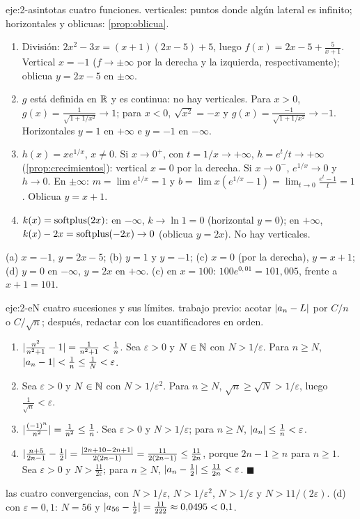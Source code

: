 \begin{solucion}{eje:2-asintotas}
\datos cuatro funciones.
\planteamiento verticales: puntos donde algún lateral es infinito; horizontales y oblicuas: \cref{prop:oblicua}.
\pasos
\begin{enumerate}[label=(\alph*)]
  \item División: $2x^{2}-3x=(x+1)(2x-5)+5$, luego $f(x)=2x-5+\frac{5}{x+1}$. Vertical $x=-1$ ($f\to\pm\infty$ por la derecha y la izquierda, respectivamente); oblicua $y=2x-5$ en $\pm\infty$.
  \item $g$ está definida en $\mathbb{R}$ y es continua: no hay verticales. Para $x>0$, $g(x)=\frac{1}{\sqrt{1+1/x^{2}}}\to1$; para $x<0$, $\sqrt{x^{2}}=-x$ y $g(x)=\frac{-1}{\sqrt{1+1/x^{2}}}\to-1$. Horizontales $y=1$ en $+\infty$ e $y=-1$ en $-\infty$.
  \item $h(x)=xe^{1/x}$, $x\ne0$. Si $x\to0^{+}$, con $t=1/x\to+\infty$, $h=e^{t}/t\to+\infty$ (\cref{prop:crecimientos}): vertical $x=0$ por la derecha. Si $x\to0^{-}$, $e^{1/x}\to0$ y $h\to0$. En $\pm\infty$: $m=\lim e^{1/x}=1$ y $b=\lim x(e^{1/x}-1)=\lim_{t\to0}\frac{e^{t}-1}{t}=1$. Oblicua $y=x+1$.
  \item $k(x)=\operatorname{softplus}(2x)$: en $-\infty$, $k\to\ln1=0$ (horizontal $y=0$); en $+\infty$, $k(x)-2x=\operatorname{softplus}(-2x)\to0$ (oblicua $y=2x$). No hay verticales.
\end{enumerate}
\resultado (a) $x=-1$, $y=2x-5$; (b) $y=1$ y $y=-1$; (c) $x=0$ (por la derecha), $y=x+1$; (d) $y=0$ en $-\infty$, $y=2x$ en $+\infty$.
\comprobacion (c) en $x=100$: $100e^{0{,}01}=101{,}005$, frente a $x+1=101$.
\end{solucion}

\begin{solucion}{eje:2-eN}
\datos cuatro sucesiones y sus límites.
\planteamiento trabajo previo: acotar $\lvert a_n-L\rvert$ por $C/n$ o $C/\sqrt n$; después, redactar con los cuantificadores en orden.
\pasos
\begin{enumerate}[label=(\alph*)]
  \item $\lvert\frac{n^{2}}{n^{2}+1}-1\rvert=\frac{1}{n^{2}+1}<\frac1n$. Sea $\varepsilon>0$ y $N\in\mathbb{N}$ con $N>1/\varepsilon$. Para $n\ge N$, $\lvert a_n-1\rvert<\frac1n\le\frac1N<\varepsilon$.
  \item Sea $\varepsilon>0$ y $N\in\mathbb{N}$ con $N>1/\varepsilon^{2}$. Para $n\ge N$, $\sqrt n\ge\sqrt N>1/\varepsilon$, luego $\frac{1}{\sqrt n}<\varepsilon$.
  \item $\lvert\frac{(-1)^{n}}{n^{2}}\rvert=\frac{1}{n^{2}}\le\frac1n$. Sea $\varepsilon>0$ y $N>1/\varepsilon$; para $n\ge N$, $\lvert a_n\rvert\le\frac1n<\varepsilon$.
  \item $\lvert\frac{n+5}{2n-1}-\frac12\rvert=\frac{\lvert2n+10-2n+1\rvert}{2(2n-1)}=\frac{11}{2(2n-1)}\le\frac{11}{2n}$, porque $2n-1\ge n$ para $n\ge1$. Sea $\varepsilon>0$ y $N>\frac{11}{2\varepsilon}$; para $n\ge N$, $\lvert a_n-\frac12\rvert\le\frac{11}{2n}<\varepsilon$. \hfill$\blacksquare$
\end{enumerate}
\resultado las cuatro convergencias, con $N>1/\varepsilon$, $N>1/\varepsilon^{2}$, $N>1/\varepsilon$ y $N>11/(2\varepsilon)$.
\comprobacion (d) con $\varepsilon=0{,}1$: $N=56$ y $\lvert a_{56}-\frac12\rvert=\frac{11}{222}\approx0{,}0495<0{,}1$.
\end{solucion}

